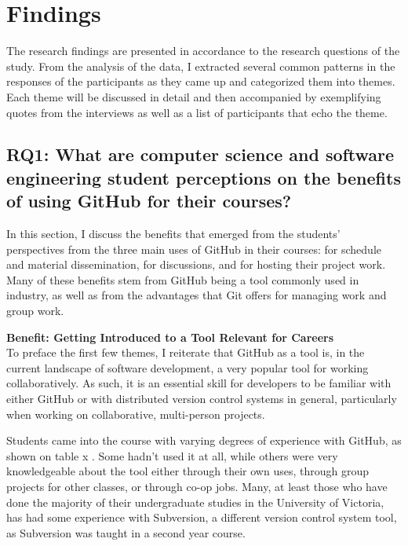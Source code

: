 \section{Findings}

The research findings are presented in accordance to the research questions of the study. From the analysis of the data, I extracted several common patterns in the responses of the participants as they came up and categorized them into themes. Each theme will be discussed in detail and then accompanied by exemplifying quotes from the interviews as well as a list of participants that echo the theme.



\subsection{RQ1: What are computer science and software engineering student perceptions on the benefits of using GitHub for their courses?}
In this section, I discuss the benefits that emerged from the students' perspectives from the three main uses of GitHub in their courses: for schedule and material dissemination, for discussions, and for hosting their project work. Many of these benefits stem from GitHub being a tool commonly used in industry, as well as from the advantages that Git offers for managing work and group work.

\textbf{Benefit: Getting Introduced to a Tool Relevant for Careers} \\

To preface the first few themes, I reiterate that GitHub as a tool is, in the current landscape of software development, a very popular tool for working collaboratively. As such, it is an essential skill for developers to be familiar with either GitHub or with distributed version control systems in general, particularly when working on collaborative, multi-person projects.

Students came into the course with varying degrees of experience with GitHub, as shown on table x . Some hadn't used it at all, while others were very knowledgeable about the tool either through their own uses, through group projects for other classes, or through co-op jobs. Many, at least those who have done the majority of their undergraduate studies in the University of Victoria, has had some experience with Subversion, a different version control system tool, as Subversion was taught in a second year course.

